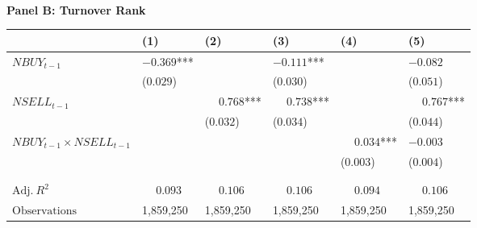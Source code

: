 \begin{table}
\begin{threeparttable}
\phantom{ }\\
\textbf{Panel B: Turnover Rank}
\begin{tabular}[t]{>{\raggedright\arraybackslash}p{4.4cm}>{\raggedright\arraybackslash}p{1.6cm}>{\raggedright\arraybackslash}p{1.6cm}>{\raggedright\arraybackslash}p{1.6cm}>{\raggedright\arraybackslash}p{1.6cm}>{\raggedright\arraybackslash}p{1.6cm}}
\toprule
 & \phantom{-}(1) & \phantom{-}(2) & \phantom{-}(3) & \phantom{-}(4) & \phantom{-}(5)\\
\midrule
$NBUY_{t-1}$ & $-0.369$*** &  & $-0.111$*** &  & $-0.082$\\
 & (\phantom{-}$0.029$) &  & (\phantom{-}$0.030$) &  & (\phantom{-}$0.051$)\\
\addlinespace
$NSELL_{t-1}$ &  & $\phantom{-}0.768$*** & $\phantom{-}0.738$*** &  & $\phantom{-}0.767$***\\
 &  & (\phantom{-}$0.032$) & (\phantom{-}$0.034$) &  & (\phantom{-}$0.044$)\\
\addlinespace
$NBUY_{t-1} \times NSELL_{t-1}$ &  &  &  & $\phantom{-}0.034$*** & $-0.003$\\
 &  &  &  & (\phantom{-}$0.003$) & (\phantom{-}$0.004$)\\
 &  &  &  &  \vphantom{1} & \\
\midrule
 &  &  &  &  & \\
$\textrm{Adj.} \: R^2$ & {$\phantom{-}0.093$} & {$\phantom{-}0.106$} & {$\phantom{-}0.106$} & {$\phantom{-}0.094$} & {$\phantom{-}0.106$}\\
$\textrm{Observations}$ & {\phantom{-}1,859,250} & {\phantom{-}1,859,250} & {\phantom{-}1,859,250} & {\phantom{-}1,859,250} & {\phantom{-}1,859,250}\\
\bottomrule
\end{tabular}
\begin{tablenotes}
\item 
\end{tablenotes}
\end{threeparttable}




\centering\fontsize{9}{11}\selectfont


\end{table}
